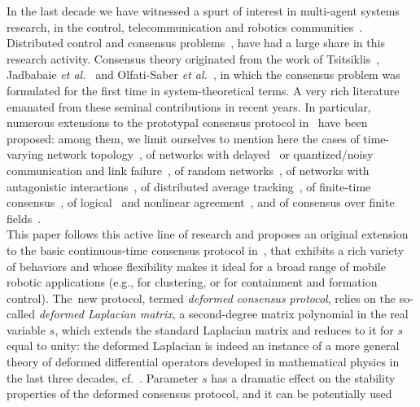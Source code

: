 \documentclass[letterpaper,9pt,twocolumn]{autart}
\begin{document}
In the last decade we have witnessed a spurt of interest in multi-agent systems research, in the
control, telecommunication and robotics communities~\cite{BulloCoMa_book09,MesbahiEg_book10,Zampieri_IFAC08,Springer_Handbook08_ch41}.
Distributed control and consensus problems~\cite{OlfatiFaMu_IEEE07,RenBeAt_CSM07}, 
have had a large share in this research activity. Consensus theory originated from the work
of Tsitsiklis~\cite{Tsitsiklis_PhD84}, Jadbabaie \emph{et al.}~\cite{JadbabaieJiMo_TAC03}
and Olfati-Saber \emph{et al.}~\cite{OlfatiSaberMu_TAC04}, in which the consensus problem
was formulated for the first time in system-theoretical terms.
A very rich literature emanated from these seminal contributions in recent years. In particular,
numerous extensions to the prototypal consensus protocol in~\cite{OlfatiSaberMu_TAC04}
have been proposed: among them, we limit
ourselves to mention here the cases of time-varying network topology~\cite{Moreau_TAC05,RenBe_TAC05},
of networks with delayed~\cite{OlfatiSaberMu_TAC04} or quantized\big/noisy communication and link
failure~\cite{FrascaCaFaZa_IJRNC09,KarMo_TSP09}, of random networks~\cite{PorfiriSt_TAC07,TahbazJa_TAC08,FagnaniZa_JSAC08},
of networks with antagonistic interactions~\cite{Altafini_PLOSONE12,Altafini_TAC13},
of distributed average tracking~\cite{SpanosOlMu_IFAC05,YangFrLy_TAC08,ChenCaRe_TAC12}, 
of finite-time consensus~\cite{WangXi_TAC10,Kibangou_ACC12}, of logical~\cite{FagioliniViBi_CDC08} and nonlinear
agreement~\cite{BausoGiPe_SCL06,Cortes_AUTO08}, 
and of consensus over finite fields~\cite{PasqualettiBoBu_AUTO13}.\\
This paper follows this active line of research and proposes an original extension to the basic continuous-time consensus protocol in~\cite{OlfatiSaberMu_TAC04},
that exhibits a rich variety of behaviors and whose flexibility makes it ideal for a broad range of mobile
robotic \mbox{applications} (e.g., for clustering, or for containment and formation control).
The~new protocol, termed \emph{deformed consensus protocol}, relies on the
so-called \emph{deformed Laplacian matrix}, a second-degree matrix polynomial in the real variable $s$,
which extends the standard Laplacian matrix and reduces to it for $s$ equal to unity: the deformed Laplacian is indeed
an instance of a more general theory of deformed differential operators developed in mathematical physics in
the last three decades, cf.~\cite[Ch. 18]{HislopSi_book96}. Parameter $s$ has a dramatic
effect on the stability properties of the deformed consensus protocol, and it can be potentially used
\end{document}
